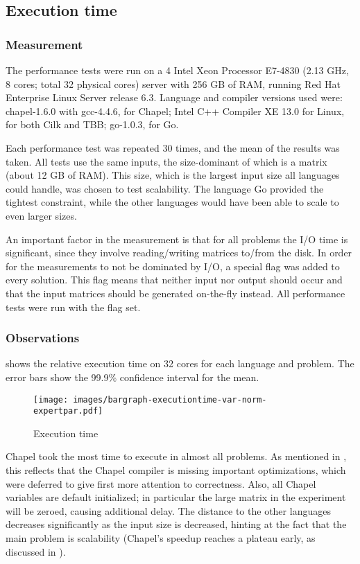 \subsection{Execution time}
\label{sec:execution-time}

\subsubsection{Measurement} The performance tests were run on a 4  Intel Xeon Processor E7-4830 (2.13 GHz, 8 cores; total 32 physical cores) server with 256 GB of RAM, running Red Hat Enterprise Linux Server release 6.3. Language and compiler versions used were: chapel-1.6.0 with gcc-4.4.6, for Chapel; Intel C++ Compiler XE 13.0 for Linux, for both Cilk and TBB; go-1.0.3, for Go.

Each performance test was repeated 30 times, and the mean of the results was taken. All tests use the same inputs, the size-dominant of which is a  matrix (about 12 GB of RAM). This size, which is the largest input size all languages could handle, was chosen to test scalability. The language Go provided the tightest constraint, while the other languages would have been able to scale to even larger sizes. 

An important factor in the measurement is that for all problems the I/O time is significant, since they involve reading/writing matrices to/from the disk. In order for the measurements to not be dominated by I/O, a special flag  was added to every solution. This flag means that neither input nor output should occur and that the input matrices should be generated on-the-fly instead. All performance tests were run with the  flag set.

\subsubsection{Observations}  shows the relative execution time on 32 cores for each language and problem. The error bars show the 99.9\% confidence interval for the mean.

\begin{figure}[ht]
  \centering
  \texttt{[image: images/bargraph-executiontime-var-norm-expertpar.pdf]}
  \caption{Execution time}
  \label{fig:exec:time}
\end{figure}

Chapel took the most time to execute in almost all problems. As mentioned in , this reflects that the Chapel compiler is missing important optimizations, which were deferred to give first more attention to correctness. Also, all Chapel variables are default initialized; in particular the large matrix in the experiment will be zeroed, causing additional delay.  The distance to the other languages decreases significantly as the input size is decreased, hinting at the fact that the main problem is scalability (Chapel's speedup reaches a plateau early, as discussed in ).

